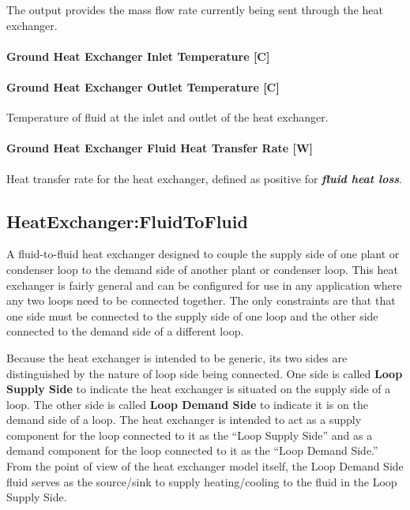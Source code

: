 The output provides the mass flow rate currently being sent through the heat exchanger.

\paragraph{Ground Heat Exchanger Inlet Temperature {[}C{]}}\label{ground-heat-exchanger-inlet-temperature-c-3}

\paragraph{Ground Heat Exchanger Outlet Temperature {[}C{]}}\label{ground-heat-exchanger-outlet-temperature-c-3}

Temperature of fluid at the inlet and outlet of the heat exchanger.

\paragraph{Ground Heat Exchanger Fluid Heat Transfer Rate {[}W{]}}\label{ground-heat-exchanger-fluid-heat-transfer-rate-w}

Heat transfer rate for the heat exchanger, defined as positive for \textbf{\emph{fluid heat loss}}.

\subsection{HeatExchanger:FluidToFluid}\label{heatexchangerfluidtofluid}

A fluid-to-fluid heat exchanger designed to couple the supply side of one plant or condenser loop to the demand side of another plant or condenser loop.
This heat exchanger is fairly general and can be configured for use in any application where any two loops need to be connected together.
The only constraints are that that one side must be connected to the supply side of one loop and the other side connected to the demand side of a different loop.

Because the heat exchanger is intended to be generic, its two sides are distinguished by the nature of loop side being connected.
One side is called \textbf{Loop Supply Side} to indicate the heat exchanger is situated on the supply side of a loop.
The other side is called \textbf{Loop Demand Side} to indicate it is on the demand side of a loop.
The heat exchanger is intended to act as a supply component for the loop connected to it as the ``Loop Supply Side''
and as a demand component for the loop connected to it as the ``Loop Demand Side.''
From the point of view of the heat exchanger model itself, the Loop Demand Side fluid serves as the source/sink to supply heating/cooling to the fluid in the Loop Supply Side.

